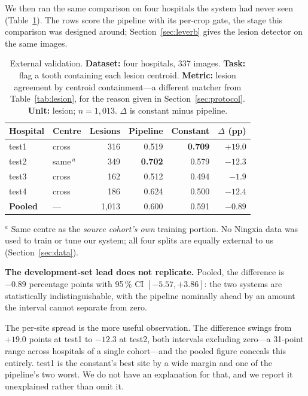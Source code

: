 \documentclass[conference]{IEEEtran}
\begin{document}
We then ran the same comparison on four hospitals the system had never seen
(Table~\ref{tab:external}). The rows score the pipeline with its per-crop gate,
the stage this comparison was designed around; Section~\ref{sec:leverb} gives the
lesion detector on the same images.

\begin{table}[t]
\caption{External validation. \textbf{Dataset:} four hospitals, 337 images.
\textbf{Task:} flag a tooth containing each lesion centroid. \textbf{Metric:}
lesion agreement by centroid containment---a different matcher from
Table~\ref{tab:lesion}, for the reason given in Section~\ref{sec:protocol}.
\textbf{Unit:} lesion; $n = 1{,}013$. $\Delta$ is constant minus pipeline.}
\label{tab:external}
\centering
\small
\begin{tabular}{llrrrr}
\toprule
Hospital & Centre & Lesions & Pipeline & Constant & $\Delta$ (pp) \\
\midrule
test1 & cross      & 316 & 0.519 & \textbf{0.709} & $+19.0$ \\
test2 & same\,$^{a}$ & 349 & \textbf{0.702} & 0.579 & $-12.3$ \\
test3 & cross      & 162 & 0.512 & 0.494 & $-1.9$ \\
test4 & cross      & 186 & 0.624 & 0.500 & $-12.4$ \\
\midrule
\textbf{Pooled} & --- & 1{,}013 & 0.600 & 0.591 & $-0.89$ \\
\bottomrule
\end{tabular}

\vspace{2pt}
\raggedright\footnotesize
$^{a}$ Same centre as the \emph{source cohort's own} training portion. No
Ningxia data was used to train or tune our system; all four splits are equally
external to us (Section~\ref{sec:data}).
\end{table}

\textbf{The development-set lead does not replicate.} Pooled, the difference is
$-0.89$ percentage points with 95\,\% CI $[-5.57, +3.86]$: the two systems are
statistically indistinguishable, with the pipeline nominally ahead by an amount
the interval cannot separate from zero.

The per-site spread is the more useful observation. The difference swings from
$+19.0$ points at test1 to $-12.3$ at test2, both intervals excluding zero---a
31-point range across hospitals of a single cohort---and the pooled figure conceals
this entirely.
test1 is the constant's best site by a wide margin and one of the pipeline's two
worst. We do not have an explanation for that, and we report it unexplained
rather than omit it.
\end{document}
